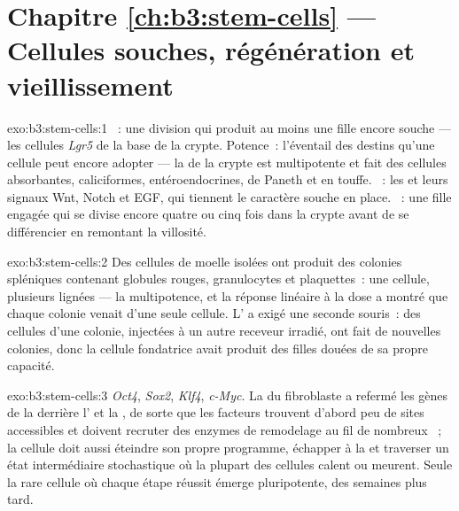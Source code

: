 \section*{Chapitre \ref{ch:b3:stem-cells} --- Cellules souches, régénération et vieillissement}

\begin{solution}{exo:b3:stem-cells:1}
~: une division qui produit au moins une fille encore
souche --- les cellules \emph{Lgr5} de la base de la crypte. Potence~:
l'éventail des destins qu'une cellule peut encore adopter --- la  de la crypte est multipotente et fait des cellules absorbantes,
caliciformes, entéroendocrines, de Paneth et en touffe. ~: les
 et leurs signaux Wnt, Notch et EGF, qui tiennent le
caractère souche en place. ~: une
fille engagée qui se divise encore quatre ou cinq fois dans la crypte
avant de se différencier en remontant la villosité.
\end{solution}

\begin{solution}{exo:b3:stem-cells:2}
Des cellules de moelle isolées ont produit des colonies spléniques
contenant globules rouges, granulocytes et plaquettes~: une cellule,
plusieurs lignées --- la multipotence, et la réponse linéaire à la dose
a montré que chaque colonie venait d'une seule cellule.
L' a exigé une seconde souris~: des cellules d'une
colonie, injectées à un autre receveur irradié, ont fait de nouvelles
colonies, donc la cellule fondatrice avait produit des filles douées de
sa propre capacité.
\end{solution}

\begin{solution}{exo:b3:stem-cells:3}
\emph{Oct4}, \emph{Sox2}, \emph{Klf4}, \emph{c-Myc}. La  du
fibroblaste a refermé les gènes de la  derrière
l' et la , de sorte que les facteurs
trouvent d'abord peu de sites accessibles et doivent recruter des
enzymes de remodelage au fil de nombreux ~; la cellule
doit aussi éteindre son propre programme, échapper à la  et
traverser un état intermédiaire stochastique où la plupart des cellules
calent ou meurent. Seule la rare cellule où chaque étape réussit émerge
pluripotente, des semaines plus tard.
\end{solution}


